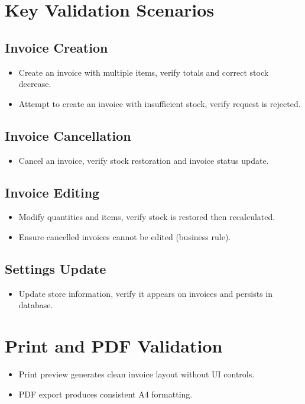\documentclass[12pt,a4paper]{report}
\begin{document}
\section{Key Validation Scenarios}
\subsection*{Invoice Creation}
\begin{itemize}
  \item Create an invoice with multiple items, verify totals and correct stock decrease.
  \item Attempt to create an invoice with insufficient stock, verify request is rejected.
\end{itemize}

\subsection*{Invoice Cancellation}
\begin{itemize}
  \item Cancel an invoice, verify stock restoration and invoice status update.
\end{itemize}

\subsection*{Invoice Editing}
\begin{itemize}
  \item Modify quantities and items, verify stock is restored then recalculated.
  \item Ensure cancelled invoices cannot be edited (business rule).
\end{itemize}

\subsection*{Settings Update}
\begin{itemize}
  \item Update store information, verify it appears on invoices and persists in database.
\end{itemize}

\section{Print and PDF Validation}
\begin{itemize}
  \item Print preview generates clean invoice layout without UI controls.
  \item PDF export produces consistent A4 formatting.
\end{itemize}
\end{document}
